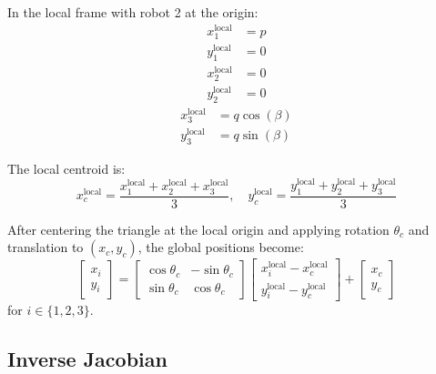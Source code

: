 \documentclass[lettersize,journal]{IEEEtran}
\begin{document}
In the local frame with robot 2 at the origin:
\begin{equation}
\begin{aligned}
x_1^{\text{local}} &= p \\
y_1^{\text{local}} &= 0
\end{aligned}
\end{equation}
\begin{equation}
\begin{aligned}
x_2^{\text{local}} &= 0 \\
y_2^{\text{local}} &= 0
\end{aligned}
\end{equation}
\begin{equation}
\begin{aligned}
x_3^{\text{local}} &= q\cos(\beta) \\
y_3^{\text{local}} &= q\sin(\beta)
\end{aligned}
\end{equation}

The local centroid is:
\begin{equation}
x_c^{\text{local}} = \frac{x_1^{\text{local}} + x_2^{\text{local}} + x_3^{\text{local}}}{3}, \quad y_c^{\text{local}} = \frac{y_1^{\text{local}} + y_2^{\text{local}} + y_3^{\text{local}}}{3}
\end{equation}

After centering the triangle at the local origin and applying rotation $\theta_c$ and translation to $(x_c, y_c)$, the global positions become:
\begin{equation}
\begin{bmatrix} x_i \\ y_i \end{bmatrix} = \begin{bmatrix} \cos\theta_c & -\sin\theta_c \\ \sin\theta_c & \cos\theta_c \end{bmatrix} \begin{bmatrix} x_i^{\text{local}} - x_c^{\text{local}} \\ y_i^{\text{local}} - y_c^{\text{local}} \end{bmatrix} + \begin{bmatrix} x_c \\ y_c \end{bmatrix}
\end{equation}
for $i \in \{1, 2, 3\}$.

\subsection{Inverse Jacobian}
\end{document}
